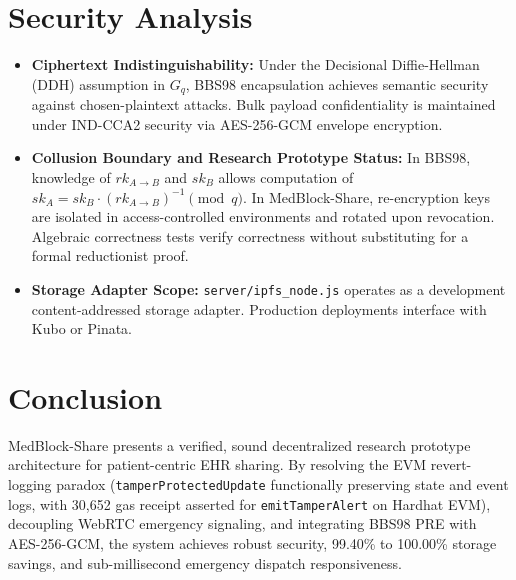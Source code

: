 \documentclass[journal,10pt,twocolumn]{IEEEtran}
\begin{document}
\section{Security Analysis}
\begin{itemize}
    \item \textbf{Ciphertext Indistinguishability:} Under the Decisional Diffie-Hellman (DDH) assumption in $G_q$, BBS98 encapsulation achieves semantic security against chosen-plaintext attacks. Bulk payload confidentiality is maintained under IND-CCA2 security via AES-256-GCM envelope encryption.
    \item \textbf{Collusion Boundary and Research Prototype Status:} In BBS98, knowledge of $rk_{A \to B}$ and $sk_B$ allows computation of $sk_A = sk_B \cdot (rk_{A \to B})^{-1} \pmod q$. In MedBlock-Share, re-encryption keys are isolated in access-controlled environments and rotated upon revocation. Algebraic correctness tests verify correctness without substituting for a formal reductionist proof.
    \item \textbf{Storage Adapter Scope:} \texttt{server/ipfs\_node.js} operates as a development content-addressed storage adapter. Production deployments interface with Kubo or Pinata.
\end{itemize}

\section{Conclusion}
MedBlock-Share presents a verified, sound decentralized research prototype architecture for patient-centric EHR sharing. By resolving the EVM revert-logging paradox (\texttt{tamperProtectedUpdate} functionally preserving state and event logs, with 30,652 gas receipt asserted for \texttt{emitTamperAlert} on Hardhat EVM), decoupling WebRTC emergency signaling, and integrating BBS98 PRE with AES-256-GCM, the system achieves robust security, 99.40\% to 100.00\% storage savings, and sub-millisecond emergency dispatch responsiveness.
\end{document}
